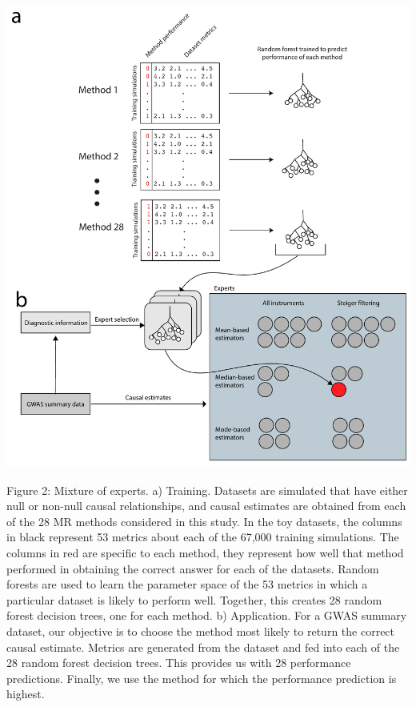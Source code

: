 \documentclass[]{article}
\begin{document}
\newpage

\includegraphics{images/fig2.pdf}

Figure 2: Mixture of experts. a) Training. Datasets are simulated that
have either null or non-null causal relationships, and causal estimates
are obtained from each of the 28 MR methods considered in this study. In
the toy datasets, the columns in black represent 53 metrics about each
of the 67,000 training simulations. The columns in red are specific to
each method, they represent how well that method performed in obtaining
the correct answer for each of the datasets. Random forests are used to
learn the parameter space of the 53 metrics in which a particular
dataset is likely to perform well. Together, this creates 28 random
forest decision trees, one for each method. b) Application. For a GWAS
summary dataset, our objective is to choose the method most likely to
return the correct causal estimate. Metrics are generated from the
dataset and fed into each of the 28 random forest decision trees. This
provides us with 28 performance predictions. Finally, we use the method
for which the performance prediction is highest.

\newpage
\end{document}
